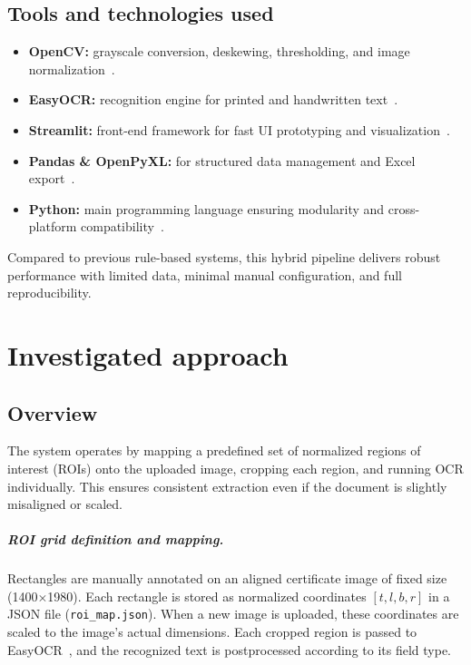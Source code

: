 \documentclass[runningheads,a4paper,11pt]{report}
\begin{document}
\section{Tools and technologies used}
\begin{itemize}
  \item \textbf{OpenCV:} grayscale conversion, deskewing, thresholding, and image normalization~\cite{Bradski2000}.
  \item \textbf{EasyOCR:} recognition engine for printed and handwritten text~\cite{JaidedAI2020}.
  \item \textbf{Streamlit:} front-end framework for fast UI prototyping and visualization~\cite{Streamlit2023}.
  \item \textbf{Pandas \& OpenPyXL:} for structured data management and Excel export~\cite{McKinney2010,OpenPyXL2024}.
  \item \textbf{Python:} main programming language ensuring modularity and cross-platform compatibility~\cite{PythonDocs}.
\end{itemize}

Compared to previous rule-based systems, this hybrid pipeline delivers robust performance with limited data, minimal manual configuration, and full reproducibility.




\chapter{Investigated approach}
\label{chapter:proposedApproach}

\section{Overview}
The system operates by mapping a predefined set of normalized regions of interest (ROIs) onto the uploaded image, cropping each region, and running OCR individually.  
This ensures consistent extraction even if the document is slightly misaligned or scaled.  

\paragraph{ROI grid definition and mapping.}
Rectangles are manually annotated on an aligned certificate image of fixed size (1400$\times$1980).  
Each rectangle is stored as normalized coordinates $[t, l, b, r]$ in a JSON file (\texttt{roi\_map.json}).  
When a new image is uploaded, these coordinates are scaled to the image's actual dimensions.  
Each cropped region is passed to EasyOCR~\cite{JaidedAI2020}, and the recognized text is postprocessed according to its field type.
\end{document}
